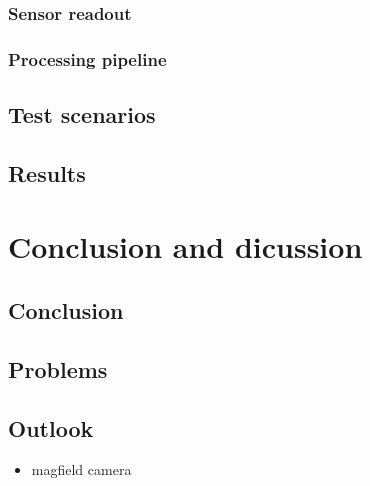\hypertarget{sensor-readout}{%
\subsection{Sensor readout}\label{sensor-readout}}

\hypertarget{processing-pipeline}{%
\subsection{Processing pipeline}\label{processing-pipeline}}

\hypertarget{test-scenarios}{%
\section{Test scenarios}\label{test-scenarios}}

\hypertarget{results}{%
\section{Results}\label{results}}

\hypertarget{conclusion-and-dicussion}{%
\chapter{Conclusion and dicussion}\label{conclusion-and-dicussion}}

\hypertarget{conclusion}{%
\section{Conclusion}\label{conclusion}}

\hypertarget{problems}{%
\section{Problems}\label{problems}}

\hypertarget{outlook}{%
\section{Outlook}\label{outlook}}

\begin{itemize}
\tightlist
\item
  magfield camera
\end{itemize}

